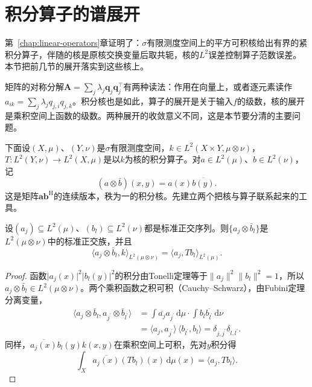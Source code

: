 \section{积分算子的谱展开}
\label{sec:ospec-integral-expansion}

第~\ref{chap:linear-operators}章证明了：$\sigma$有限测度空间上的平方可积核给出有界的紧积分算子，伴随的核是原核交换变量后取共轭，核的$L^2$误差控制算子范数误差。本节把前几节的展开落实到这些核上。

矩阵的对称分解$\bm A=\sum_j\lambda_j\bm q_j\bm q_j^\top$有两种读法：作用在向量上，或者逐元素读作$a_{ik}=\sum_j\lambda_jq_{j,i}q_{j,k}$。积分核也是如此，算子的展开是关于输入$f$的级数，核的展开是乘积空间上函数的级数。两种展开的收敛意义不同，这是本节要分清的主要问题。

下面设$(X,\mu)$、$(Y,\nu)$是$\sigma$有限测度空间，$k\in L^2(X\times Y,\mu\otimes\nu)$，$T:L^2(Y,\nu)\to L^2(X,\mu)$是以$k$为核的积分算子。对$a\in L^2(\mu)$、$b\in L^2(\nu)$，记
\[
(a\otimes\bar b)(x,y)=a(x)\overline{b(y)} .
\]
这是矩阵$\bm a\bm b^{\mathrm H}$的连续版本，秩为一的积分核。先建立两个把核与算子联系起来的工具。

\begin{lemma}[乘积函数与核系数]
\label{lem:ospec-product-coefficients}
设$(a_j)\subseteq L^2(\mu)$、$(b_l)\subseteq L^2(\nu)$都是标准正交序列。则$\{a_j\otimes\bar b_l\}$是$L^2(\mu\otimes\nu)$中的标准正交族，并且
\begin{equation}
\langle a_j\otimes\bar b_l,k\rangle_{L^2(\mu\otimes\nu)}=\langle a_j,Tb_l\rangle_{L^2(\mu)} .
\label{eq:ospec-kernel-coefficient}
\end{equation}
\end{lemma}

\begin{proof}
函数$\lvert a_j(x)\rvert^2\lvert b_l(y)\rvert^2$的积分由Tonelli定理等于$\lVert a_j\rVert^2\lVert b_l\rVert^2=1$，所以$a_j\otimes\bar b_l\in L^2(\mu\otimes\nu)$。两个乘积函数之积可积（Cauchy--Schwarz），由Fubini定理分离变量，
\[
\begin{aligned}
\langle a_j\otimes\bar b_l,a_{j^\prime}\otimes\bar b_{l^\prime}\rangle&=\int\overline{a_j}a_{j^\prime}\,\mathrm d\mu\cdot\int b_l\overline{b_{l^\prime}}\,\mathrm d\nu\\
&=\langle a_j,a_{j^\prime}\rangle\,\langle b_{l^\prime},b_l\rangle=\delta_{j,j^\prime}\delta_{l,l^\prime}.
\end{aligned}
\]
同样，$\overline{a_j(x)}b_l(y)k(x,y)$在乘积空间上可积，先对$y$积分得
\[
\int_X\overline{a_j(x)}(Tb_l)(x)\,\mathrm d\mu(x)=\langle a_j,Tb_l\rangle.
\]
\end{proof}

